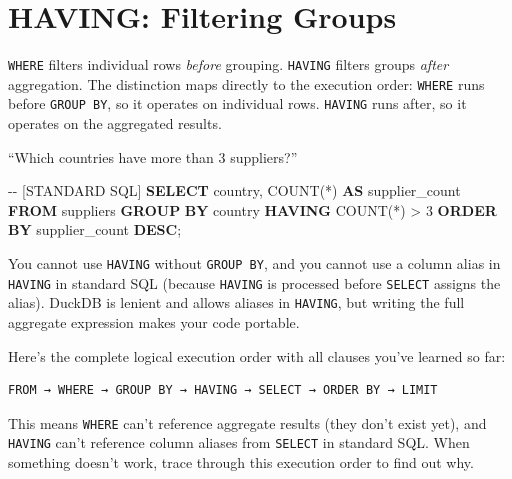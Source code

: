 \documentclass[
  letterpaper,
  DIV=11,
  numbers=noendperiod]{scrreprt}
\newenvironment{Shaded}{\begin{snugshade}}{\end{snugshade}}
\newcommand{\CommentTok}[1]{\textcolor[rgb]{0.37,0.37,0.37}{#1}}
\newcommand{\DecValTok}[1]{\textcolor[rgb]{0.68,0.00,0.00}{#1}}
\newcommand{\FunctionTok}[1]{\textcolor[rgb]{0.28,0.35,0.67}{#1}}
\newcommand{\KeywordTok}[1]{\textcolor[rgb]{0.00,0.23,0.31}{\textbf{#1}}}
\newcommand{\NormalTok}[1]{\textcolor[rgb]{0.00,0.23,0.31}{#1}}
\newcommand{\OperatorTok}[1]{\textcolor[rgb]{0.37,0.37,0.37}{#1}}
\begin{document}
\section{HAVING: Filtering Groups}\label{having-filtering-groups}

\texttt{WHERE} filters individual rows \emph{before} grouping.
\texttt{HAVING} filters groups \emph{after} aggregation. The distinction
maps directly to the execution order: \texttt{WHERE} runs before
\texttt{GROUP\ BY}, so it operates on individual rows. \texttt{HAVING}
runs after, so it operates on the aggregated results.

``Which countries have more than 3 suppliers?''

\begin{codelisting}

\caption{\texttt{duckdb}}

\begin{Shaded}
\begin{Highlighting}[]
\CommentTok{{-}{-} [STANDARD SQL]}
\KeywordTok{SELECT}
\NormalTok{    country,}
    \FunctionTok{COUNT}\NormalTok{(}\OperatorTok{*}\NormalTok{) }\KeywordTok{AS}\NormalTok{ supplier\_count}
\KeywordTok{FROM}\NormalTok{ suppliers}
\KeywordTok{GROUP} \KeywordTok{BY}\NormalTok{ country}
\KeywordTok{HAVING} \FunctionTok{COUNT}\NormalTok{(}\OperatorTok{*}\NormalTok{) }\OperatorTok{\textgreater{}} \DecValTok{3}
\KeywordTok{ORDER} \KeywordTok{BY}\NormalTok{ supplier\_count }\KeywordTok{DESC}\NormalTok{;}
\end{Highlighting}
\end{Shaded}

\end{codelisting}

You cannot use \texttt{HAVING} without \texttt{GROUP\ BY}, and you
cannot use a column alias in \texttt{HAVING} in standard SQL (because
\texttt{HAVING} is processed before \texttt{SELECT} assigns the alias).
DuckDB is lenient and allows aliases in \texttt{HAVING}, but writing the
full aggregate expression makes your code portable.

Here's the complete logical execution order with all clauses you've
learned so far:

\begin{verbatim}
FROM → WHERE → GROUP BY → HAVING → SELECT → ORDER BY → LIMIT
\end{verbatim}

This means \texttt{WHERE} can't reference aggregate results (they don't
exist yet), and \texttt{HAVING} can't reference column aliases from
\texttt{SELECT} in standard SQL. When something doesn't work, trace
through this execution order to find out why.
\end{document}
